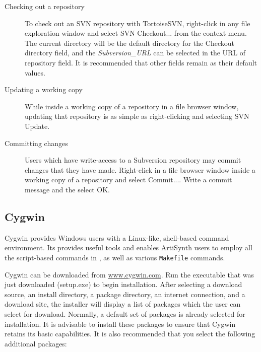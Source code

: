 \begin{description}

\item[Checking out a repository]

To check out an SVN repository with TortoiseSVN, right-click in any
file exploration window and select {\sf SVN Checkout...} from the
context menu. The current directory will be the default directory for
the {\sf Checkout directory} field, and the {\it Subversion\_URL} can
be selected in the {\sf URL of repository} field. It is recommended
that other fields remain as their default values.

\item[Updating a working copy]

While inside a working copy of a repository in a file browser window,
updating that repository is as simple as right-clicking and selecting
{\sf SVN Update}.

\item[Committing changes]

Users which have write-access to a Subversion repository may commit
changes that they have made.  Right-click in a file browser window
inside a working copy of a repository and select {\sf
Commit...}. Write a commit message and the select {\sf OK}.

\end{description}

\subsection{Cygwin}
\label{Cygwin}

Cygwin provides Windows users with a Linux-like, shell-based command
environment.  Its provides useful tools and enables ArtiSynth users to
employ all the script-based commands in , as well
as various {\tt Makefile} commands.

Cygwin can be downloaded from 
\href{http://www.cygwin.com}{www.cygwin.com}. Run the
executable that was just downloaded (setup.exe) to begin
installation. After selecting a download source, an install directory,
a package directory, an internet connection, and a download site, the
installer will display a list of packages which the user can select
for download. Normally, a default set of packages is already selected
for installation. It is advisable to install these packages to ensure
that Cygwin retains its basic capabilities. It is also recommended
that you select the following additional packages:

